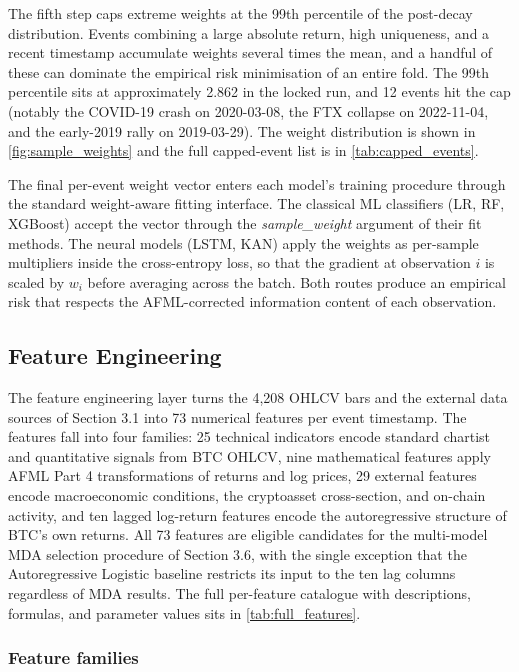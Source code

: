 \documentclass[12pt,a4paper,oneside]{article}
\begin{document}
The fifth step caps extreme weights at the 99th percentile of the post-decay distribution. Events combining a large absolute return, high uniqueness, and a recent timestamp accumulate weights several times the mean, and a handful of these can dominate the empirical risk minimisation of an entire fold. The 99th percentile sits at approximately 2.862 in the locked run, and 12 events hit the cap (notably the COVID-19 crash on 2020-03-08, the FTX collapse on 2022-11-04, and the early-2019 rally on 2019-03-29). The weight distribution is shown in \label{ref:weights_call}\autoref{fig:sample_weights} and the full capped-event list is in \autoref{tab:capped_events}.

The final per-event weight vector enters each model's training procedure through the standard weight-aware fitting interface. The classical ML classifiers (LR, RF, XGBoost) accept the vector through the \textit{sample\_weight} argument of their fit methods. The neural models (LSTM, KAN) apply the weights as per-sample multipliers inside the cross-entropy loss, so that the gradient at observation $i$ is scaled by $w_i$ before averaging across the batch. Both routes produce an empirical risk that respects the AFML-corrected information content of each observation.


\subsection{Feature Engineering}\label{subsec:features}

The feature engineering layer turns the 4,208 OHLCV bars and the external data sources of Section 3.1 into 73 numerical features per event timestamp. The features fall into four families: 25 technical indicators encode standard chartist and quantitative signals from BTC OHLCV, nine mathematical features apply AFML Part 4 transformations of returns and log prices, 29 external features encode macroeconomic conditions, the cryptoasset cross-section, and on-chain activity, and ten lagged log-return features encode the autoregressive structure of BTC's own returns. All 73 features are eligible candidates for the multi-model MDA selection procedure of Section 3.6, with the single exception that the Autoregressive Logistic baseline restricts its input to the ten lag columns regardless of MDA results. The full per-feature catalogue with descriptions, formulas, and parameter values sits in \label{ref:features_call}\autoref{tab:full_features}.


\subsubsection{Feature families}\label{subsubsec:feature_families}
\end{document}
